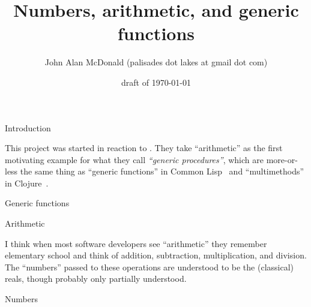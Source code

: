 \documentclass[12pt]{PalisadesLakesBook}
\title{Numbers, arithmetic, and generic functions}
\author{John Alan McDonald 
(palisades dot lakes at gmail dot com)}
\date{draft of \today}
\begin{document}
\maketitle
{}
\begin{plSection}{Introduction} 

This project was started in reaction to 
.
They take ``arithmetic'' as the first motivating example 
for what they call \textit{``generic procedures''},
which are more-or-less the same thing as 
``generic functions'' in Common Lisp~\cite{Steele:1990:CLTL2}
and ``multimethods'' in Clojure~\cite{Clojure:Multimethods}.


\end{plSection}%
\begin{plSection}{Generic functions} 



\end{plSection}%
\begin{plSection}{Arithmetic} 

I think when most software developers see ``arithmetic''
they remember elementary school
and think of addition, subtraction, multiplication, and division.
The ``numbers'' passed to these operations are 
understood to be the (classical) reals, 
though probably only partially understood.


\end{plSection}%
\begin{plSection}{Numbers} 


\end{plSection}%
\end{document}
